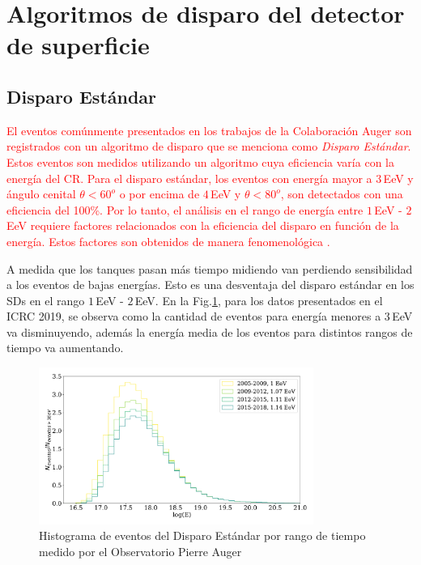 \section{Algoritmos de disparo del detector de superficie} \label{triggers_caracteristicas}

\subsection{Disparo Estándar}

\textcolor{red}{El eventos comúnmente presentados en los trabajos de la Colaboración Auger son registrados con un algoritmo de disparo que se menciona como \emph{Disparo Estándar}.  Estos eventos son medidos utilizando un algoritmo cuya eficiencia varía con la energía del CR. Para el disparo estándar, los eventos con energía mayor a $3\,$EeV y ángulo cenital $\theta<60^o$ o  por encima de $4\,$EeV y $\theta<80^o$, son detectados con una eficiencia del 100\%. Por lo tanto, el análisis en el rango de energía entre $1\,$EeV - $2\,$EeV requiere factores relacionados con la eficiencia del disparo en función de la energía. Estos factores son obtenidos de manera fenomenológica \cite{taborda}.}


A medida que los tanques pasan más tiempo midiendo van perdiendo sensibilidad a los eventos de bajas energías. Esto es una desventaja del disparo estándar en los SDs en el rango $1\,$EeV - $2\,$EeV.  En la Fig.\ref{fig:futuro}, para los datos presentados en el ICRC 2019, se observa como la cantidad de eventos para energía menores a $3\,$EeV va disminuyendo, además la energía media de los eventos para distintos rangos de tiempo va aumentando.

\begin{figure}[H]
	\centering
	\includegraphics[width=0.8\textwidth]{histograma_Standard.pdf}
	\caption{Histograma de eventos  del Disparo Estándar por rango de tiempo medido por el Observatorio Pierre Auger}
	\label{fig:futuro}
\end{figure}

